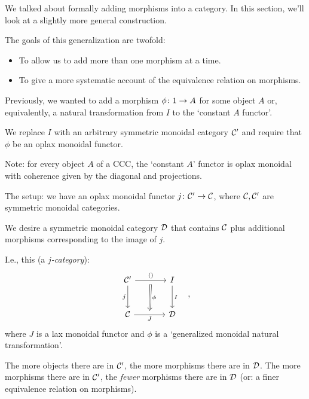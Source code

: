 \documentclass{beamer}
\begin{document}
\begin{frame}
  We talked about formally adding morphisms into a category.  
  In this section, we'll look at a slightly more general construction.
  \pause

  The goals of this generalization are twofold:
  \pause
  \begin{itemize}
    \item To allow us to add more than one morphism at a time.
      \pause
    \item To give a more systematic account of the equivalence relation on morphisms.
  \end{itemize}
  \pause

  Previously, we wanted to add a morphism $\phi\colon 1\to A$ for some object $A$ or, equivalently, a natural transformation from $I$ to the `constant $A$ functor'.
  \pause

  We replace $I$ with an arbitrary symmetric monoidal category ${\mathcal{C}}'$ and require that $\phi$ be an oplax monoidal functor.
  \pause

  Note: for every object $A$ of a CCC, the `constant $A$' functor is oplax monoidal with coherence given by the diagonal and projections.
\end{frame}

\begin{frame}
  The setup: we have an oplax monoidal functor $j\colon {\mathcal{C}}'\to{\mathcal{C}}$, where ${\mathcal{C}},{\mathcal{C}}'$ are symmetric monoidal categories.
  \pause

  We desire a symmetric monoidal category ${\mathcal{D}}$ that contains ${\mathcal{C}}$ plus additional morphisms corresponding to the image of $j$.
  \pause

  I.e., this (a \emph{$j$-category}):
  \[
    \begin{tikzcd}[row sep=large, column sep=large, ampersand replacement=\&]
      \C' \arrow[r, "()", ""'{name=term}] \arrow[d, "j"']
        \& I \arrow[d, "I"] \\
      \C \arrow[r, "J"', ""{name=J}]
        \& \D
      \arrow[Rightarrow, from=term, to=J, "\phi"]
    \end{tikzcd}\quad,
  \]
where $J$ is a lax monoidal functor and $\phi$ is a `generalized monoidal natural transformation'.
\pause

The more objects there are in ${\mathcal{C}}'$, the more morphisms there are in ${\mathcal{D}}$.  
  The more morphisms there are in ${\mathcal{C}}'$, the \emph{fewer} morphisms there are in ${\mathcal{D}}$ (or: a finer equivalence relation on morphisms).
\end{frame}
\end{document}
